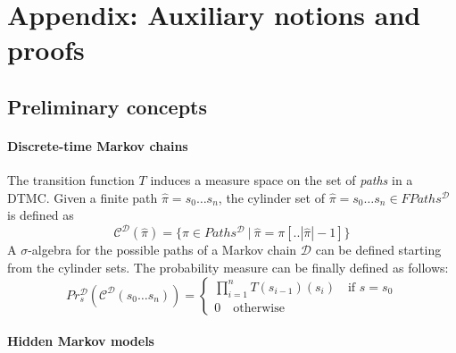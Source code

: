 \newpage
\section*{Appendix: Auxiliary notions and proofs}

\subsection*{Preliminary concepts} %
\label{sub:preliminary_concepts}

\paragraph{Discrete-time Markov chains}
The transition function $T$ induces a measure space on the set of \emph{paths} in a DTMC. 
Given a finite path $\hat\pi = s_0 \dots s_n$, the cylinder set of $\hat\pi = s_0 \dots s_n \in FPaths^{\mathcal{D}}$ is defined as
$$ \mathcal{C}^\mathcal{D}(\hat\pi) = \{ \pi \in Paths^{\mathcal{D}}\ |\ \hat\pi = \pi[..|\hat\pi|-1]\} $$
A $\sigma$-algebra for the possible paths of a Markov chain $\mathcal{D}$ can be defined starting from the cylinder sets.
The probability measure can be finally defined as follows:
\begin{equation}\label{eq:mc_cyl}
Pr^\mathcal{D}_s(\mathcal{C}^\mathcal{D}(s_0\dots s_n)) = 
\begin{cases}
	\prod_{i=1}^n T(s_{i-1})(s_i) \quad \mbox{if } s = s_0 \\
	0 \quad \mbox{otherwise}
\end{cases}
\end{equation}
\paragraph{Hidden Markov models}

